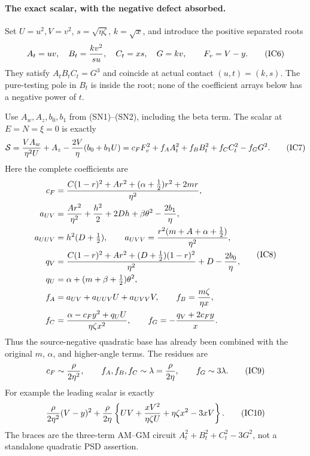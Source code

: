 \paragraph{The exact scalar, with the negative defect absorbed.}
Set $U=u^2,V=v^2$, $s=\sqrt{\eta\zeta}$, $k=\sqrt x$, and introduce
the positive separated roots
\[
 A_t=uv,\quad B_t={k v^2\over s u},\quad
 C_t=xs,\quad G=kv,\qquad F_v=V-y.
                                                               \tag{IC6}
\]
They satisfy $A_tB_tC_t=G^3$ and coincide at actual contact
$(u,t)=(k,s)$. The pure-testing pole in $B_t$ is inside the root;
none of the coefficient arrays below has a negative power of $t$.

Use $A_w,A_z,b_0,b_1$ from (SN1)--(SN2), including the beta term.
The scalar at $E=N=\xi=0$ is exactly
\[
 \mathcal S={VA_w\over\eta^2U}+A_z
                  -{2V\over\eta}(b_0+b_1U)
       =c_FF_v^2+f_AA_t^2+f_BB_t^2+f_CC_t^2-f_GG^2.    \tag{IC7}
\]
Here the complete coefficients are
\[
\begin{aligned}
 c_F={}&{C(1-r)^2+Ar^2+(\alpha+\tfrac12)r^2+2mr\over\eta^2},\\
 a_{UV}={}&{Ar^2\over\eta^2}+{h^2\over2}+2Dh+\beta\theta^2
                                     -{2b_1\over\eta},\\
 a_{UUV}={}&h^2(D+\tfrac12),\qquad
 a_{UVV}={r^2(m+A+\alpha+\tfrac12)\over\eta^2},\\
 q_V={}&{C(1-r)^2+Ar^2+(D+\tfrac12)(1-r)^2\over\eta^2}
                                     +D-{2b_0\over\eta},\\
 q_U={}&\alpha+(m+\beta+\tfrac12)\theta^2,\\
 f_A={}&a_{UV}+a_{UUV}U+a_{UVV}V,\qquad
 f_B={m\zeta\over\eta x},\\
 f_C={}&{\alpha-c_Fy^2+q_UU\over\eta\zeta x^2},\qquad
 f_G=-{q_V+2c_Fy\over x}.                              \end{aligned} \tag{IC8}
\]
Thus the source-negative quadratic base has already been combined
with the original $m$, $\alpha$, and higher-angle terms. The residues
are
\[
 c_F\sim{\rho\over2\eta^2},\qquad
 f_A,f_B,f_C\sim\lambda={\rho\over2\eta},\qquad
 f_G\sim3\lambda.                                    \tag{IC9}
\]
For example the leading scalar is exactly
\[
 {\rho\over2\eta^2}(V-y)^2+
 {\rho\over2\eta}\left\{UV+{xV^2\over\eta\zeta U}
                            +\eta\zeta x^2-3xV\right\}.
                                                               \tag{IC10}
\]
The braces are the three-term AM--GM circuit
$A_t^2+B_t^2+C_t^2-3G^2$, not a standalone quadratic PSD assertion.

